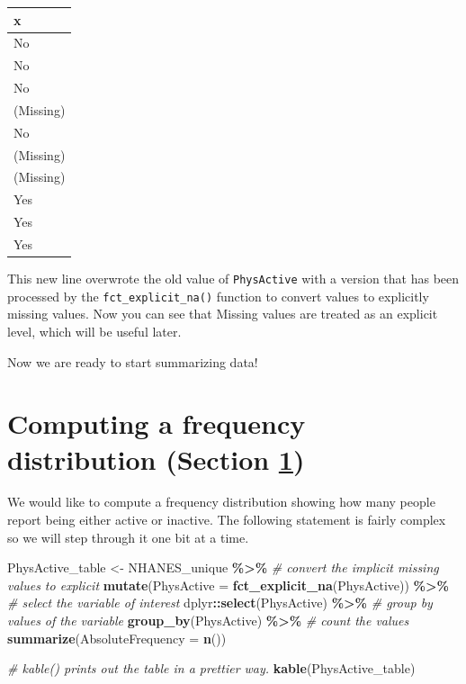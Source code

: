 \documentclass[
  12pt,
]{book}
\newenvironment{Shaded}{\begin{snugshade}}{\end{snugshade}}
\newcommand{\AttributeTok}[1]{\textcolor[rgb]{0.13,0.29,0.53}{#1}}
\newcommand{\CommentTok}[1]{\textcolor[rgb]{0.56,0.35,0.01}{\textit{#1}}}
\newcommand{\FunctionTok}[1]{\textcolor[rgb]{0.13,0.29,0.53}{\textbf{#1}}}
\newcommand{\NormalTok}[1]{#1}
\newcommand{\OtherTok}[1]{\textcolor[rgb]{0.56,0.35,0.01}{#1}}
\newcommand{\SpecialCharTok}[1]{\textcolor[rgb]{0.81,0.36,0.00}{\textbf{#1}}}
\begin{document}
\begin{tabular}{l}
\hline
x\\
\hline
No\\
\hline
No\\
\hline
No\\
\hline
(Missing)\\
\hline
No\\
\hline
(Missing)\\
\hline
(Missing)\\
\hline
Yes\\
\hline
Yes\\
\hline
Yes\\
\hline
\end{tabular}

This new line overwrote the old value of \texttt{PhysActive} with a version that has been processed by the \texttt{fct\_explicit\_na()} function to convert values to explicitly missing values. Now you can see that Missing values are treated as an explicit level, which will be useful later.

Now we are ready to start summarizing data!

\hypertarget{frequency-distributions}{%
\section{Computing a frequency distribution (Section \ref{frequency-distributions})}\label{frequency-distributions}}

We would like to compute a frequency distribution showing how many people report being either active or inactive. The following statement is fairly complex so we will step through it one bit at a time.

\begin{Shaded}
\begin{Highlighting}[]
\NormalTok{PhysActive\_table }\OtherTok{\textless{}{-}}\NormalTok{ NHANES\_unique }\SpecialCharTok{\%\textgreater{}\%}
  \CommentTok{\# convert the implicit missing values to explicit}
  \FunctionTok{mutate}\NormalTok{(}\AttributeTok{PhysActive =} \FunctionTok{fct\_explicit\_na}\NormalTok{(PhysActive)) }\SpecialCharTok{\%\textgreater{}\%}
  \CommentTok{\# select the variable of interest}
\NormalTok{  dplyr}\SpecialCharTok{::}\FunctionTok{select}\NormalTok{(PhysActive) }\SpecialCharTok{\%\textgreater{}\%} 
  \CommentTok{\# group by values of the variable}
  \FunctionTok{group\_by}\NormalTok{(PhysActive) }\SpecialCharTok{\%\textgreater{}\%} 
  \CommentTok{\# count the values}
  \FunctionTok{summarize}\NormalTok{(}\AttributeTok{AbsoluteFrequency =} \FunctionTok{n}\NormalTok{()) }

\CommentTok{\# kable() prints out the table in a prettier way.}
\FunctionTok{kable}\NormalTok{(PhysActive\_table)}
\end{Highlighting}
\end{Shaded}
\end{document}
